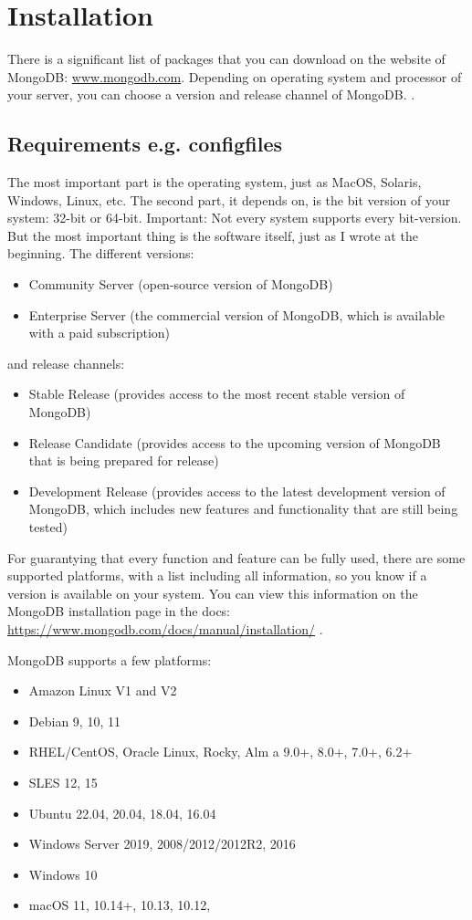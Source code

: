
\section{Installation}
There is a significant list of packages that you can download on the website of MongoDB: \url{www.mongodb.com}. 
Depending on operating system and processor of your server, you can choose a version and release channel of MongoDB. \parencite{Membrey2014}.

\subsection{Requirements e.g. configfiles}
The most important part is the operating system, just as MacOS, Solaris, Windows, Linux, etc. 
The second part, it depends on, is the bit version of your  system: 32-bit or 64-bit.
Important: Not every system supports every bit-version.
But the most important thing is the software itself, just as I wrote at the beginning.
The different versions:
\begin{itemize}
    \item Community Server (open-source version of MongoDB)
    \item Enterprise Server (the commercial version of MongoDB, which is available with a paid subscription)
\end{itemize}
and release channels:
\begin{itemize}
    \item Stable Release (provides access to the most recent stable version of MongoDB)
    \item Release Candidate (provides access to the upcoming version of MongoDB that is being prepared for release)
    \item Development Release (provides access to the latest development version of MongoDB, which includes new features and functionality that are still being tested)
\end{itemize}

For guarantying that every function and feature can be fully used, there are some supported platforms, with a list including all information, so you know if a version is available on your system.
You can view this information on the MongoDB installation page in the docs: \url{https://www.mongodb.com/docs/manual/installation/} \parencite{Membrey2014}.

MongoDB supports a few platforms: 
\begin{itemize}
    \item Amazon Linux V1 and V2
    \item Debian 9, 10, 11
    \item RHEL/CentOS, Oracle Linux, Rocky, Alm a 9.0+, 8.0+, 7.0+, 6.2+
    \item SLES 12, 15
    \item Ubuntu 22.04, 20.04, 18.04, 16.04
    \item Windows Server 2019, 2008/2012/2012R2, 2016
    \item Windows 10
    \item macOS 11, 10.14+, 10.13, 10.12, 
\end{itemize}\parencite{Mongo-Installation}

